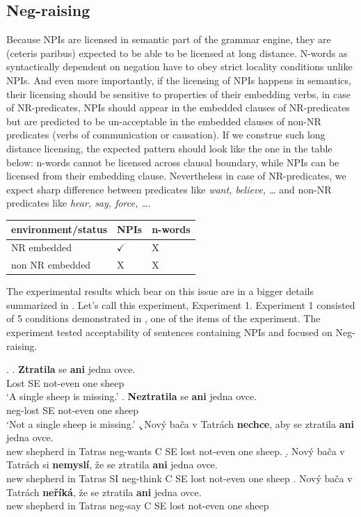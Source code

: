 \documentclass[12pt]{scrartcl}
\begin{document}
\hypertarget{neg-raising}{%
\subsection{Neg-raising}\label{neg-raising}}

Because NPIs are licensed in semantic part of the grammar engine, they are (ceteris paribus) expected to be able to be licensed at long distance. N-words as syntactically dependent on negation have to obey strict locality conditions unlike NPIs. And even more importantly, if the licensing of NPIs happens in semantics, their licensing should be sensitive to properties of their embedding verbs, in case of NR-predicates, NPIs should appear in the embedded clauses of NR-predicates but are predicted to be un-acceptable in the embedded clauses of non-NR predicates (verbs of communication or causation). If we construe such long distance licensing, the expected pattern should look like the one in the table below: n-words cannot be licensed across clausal boundary, while NPIs can be licensed from their embedding clause. Nevertheless in case of NR-predicates, we expect sharp difference between predicates like \textit{want, believe, \ldots} and non-NR predicates like \textit{hear, say, force, \ldots}.

\begin{longtable}[]{@{}lll@{}}
\toprule
environment/status & NPIs & n-words\tabularnewline
\midrule
\endhead
NR embedded & \(\checkmark\) & X\tabularnewline
non NR embedded & X & X\tabularnewline
\bottomrule
\end{longtable}

The experimental results which bear on this issue are in a bigger details summarized in \cite{dovcekal2016experimental}. Let's call this experiment, Experiment 1. Experiment 1 consisted of 5 conditions demonstrated in \Next, one of the items of the experiment. The experiment tested acceptability of sentences containing NPIs and focused on Neg-raising.

\ex. \ag. \textbf{Ztratila} se \textbf{ani} jedna ovce.\\
Lost SE not-even one sheep\\
`A single sheep is missing.' \bg. \textbf{Neztratila} se \textbf{ani}
jedna ovce.\\
neg-lost SE not-even one sheep\\
`Not a single sheep is missing.' \c. Nový bača v Tatrách
\textbf{nechce}, aby se ztratila \textbf{ani} jedna ovce.\\
new shepherd in Tatras neg-wants C SE lost not-even one sheep. \d. Nový
bača v Tatrách si \textbf{nemyslí}, že se ztratila \textbf{ani} jedna
ovce.\\
new shepherd in Tatras SI neg-think C SE lost not-even one sheep \e.
Nový bača v Tatrách \textbf{neříká}, že se ztratila \textbf{ani} jedna
ovce.\\
new shepherd in Tatras neg-say C SE lost not-even one sheep
\end{document}
